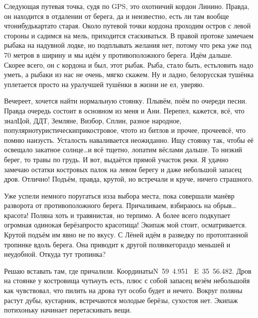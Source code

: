 Следующая путевая точка, судя по GPS, это охотничий кордон Линино. Правда, он находится в отдалении от берега, да и неизвестно, есть ли там вообще что\sdash нибудь\mdash карта\sdash то старая. Около путевой точки кордона проходим остров с левой стороны и садимся на мель, приходится стаскиваться. В правой протоке замечаем рыбака на надувной лодке, но подплывать желания нет, потому что река уже под 70 метров в ширину и мы идём у противоположного берега. Идём дальше. Скорее всего, он с кордона и был, этот рыбак. Рыба, стало быть, есть\mdash ловить надо уметь, а рыбаки из нас не очень, мягко скажем. Ну и ладно, белорусская тушёнка уплетается просто на ура\mdash лучшей тушёнки в жизни не ел, уверяю.

Вечереет, хочется найти нормальную стоянку. Плывём, поём по очереди песни. Правда очередь состоит в основном из меня и Ани. Перепел, кажется, всё, что знал\mdash Цой, ДДТ, Земляне, Визбор, Сплин, разное народное, популярно\sdash туристически\sdash прикостровое, что\sdash то из битлов и прочее, прочее\mdash всё, что помню наизусть. Усталость наваливается неожиданно. Ищу стоянку так, чтобы её освещало закатное солнце\ldots и всё тщетно, лопатим вёслами дальше. То низкий берег, то травы по грудь. И вот, выдаётся прямой участок реки. Я удачно замечаю остатки костровых палок на левом берегу и даже небольшой запасец дров. Отлично! Подъём, правда, крутой, но встречали и круче, ничего страшного.

Уже успели немного поругаться из\sdash за выбора места, пока совершали манёвр разворота от противоположного берега. Причаливаем, взбираюсь на обрыв\ldots красота! Поляна хоть и травянистая, но терпимо. А более всего подкупает огромная одинокая берёза\mdash просто красотища! Экипаж мой стоит, осматривается. Крутой подъём им явно не по вкусу. С Лёней идём в разведку по протоптанной тропинке вдоль берега. Она приводит к другой полянке\mdash гораздо меньшей и неудобной. Откуда тут тропинка? 

Решаю вставать там, где причалили. Координаты\mdash N~59\degree~4.951\textprime~ E~35\degree~56.482\textprime. Дров на стоянке у костровища чуть\sdash чуть есть, плюс с собой запасец везём небольшой\mdash я как чувствовал, что пилить на дрова тут особо будет и нечего. Вокруг поляны растут дубы, кустарник, встречаются молодые берёзы, сухостоя нет. Экипаж потихоньку начинает перетаскивать вещи. 

